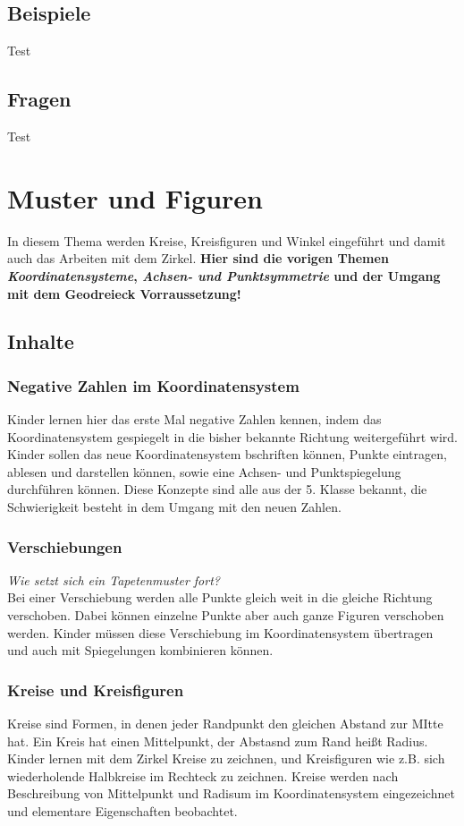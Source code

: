 \documentclass{article}
\begin{document}
\subsection{Beispiele}
\begin{tcolorbox}[colback=gray!5!white,colframe=gray!25!black]
Test
\end{tcolorbox}
\subsection{Fragen}
\begin{tcolorbox}[colback=blue!5!white,colframe=blue!25!black]
Test
\end{tcolorbox}
\newpage
\section{Muster und Figuren}
In diesem Thema werden Kreise, Kreisfiguren und Winkel eingeführt und damit auch das Arbeiten mit dem Zirkel. 
\textbf{Hier sind die vorigen Themen \textit{Koordinatensysteme}, \textit{Achsen- und Punktsymmetrie} und der Umgang mit dem Geodreieck Vorraussetzung!}
\subsection{Inhalte}
\subsubsection*{Negative Zahlen im Koordinatensystem}
Kinder lernen hier das erste Mal negative Zahlen kennen, indem das Koordinatensystem gespiegelt in die bisher bekannte Richtung weitergeführt wird.
Kinder sollen das neue Koordinatensystem bschriften können, Punkte eintragen, ablesen und darstellen können, sowie eine Achsen- und Punktspiegelung durchführen können.
Diese Konzepte sind alle aus der 5. Klasse bekannt, die Schwierigkeit besteht in dem Umgang mit den neuen Zahlen.
\subsubsection*{Verschiebungen}
\textit{Wie setzt sich ein Tapetenmuster fort?}\\
Bei einer Verschiebung  werden alle Punkte gleich weit in die gleiche Richtung verschoben. Dabei können einzelne Punkte aber auch ganze Figuren verschoben werden.
Kinder müssen diese Verschiebung im Koordinatensystem übertragen und auch mit Spiegelungen kombinieren können.
\subsubsection*{Kreise und Kreisfiguren}
Kreise sind Formen, in denen jeder Randpunkt den gleichen Abstand zur MItte hat. Ein Kreis hat einen Mittelpunkt, der Abstasnd zum Rand heißt Radius.
Kinder lernen mit dem Zirkel Kreise zu zeichnen, und Kreisfiguren wie z.B. sich wiederholende Halbkreise im Rechteck zu zeichnen.
Kreise werden nach Beschreibung von Mittelpunkt und Radisum im Koordinatensystem eingezeichnet und elementare Eigenschaften beobachtet.
\end{document}
